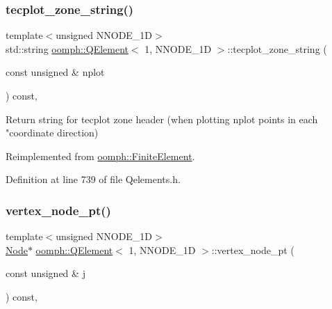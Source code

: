 \subsubsection{\texorpdfstring{tecplot\+\_\+zone\+\_\+string()}{tecplot\_zone\_string()}}
{\footnotesize\ttfamily template$<$unsigned N\+N\+O\+D\+E\+\_\+1D$>$ \\
std\+::string \hyperlink{classoomph_1_1QElement}{oomph\+::\+Q\+Element}$<$ 1, N\+N\+O\+D\+E\+\_\+1D $>$\+::tecplot\+\_\+zone\+\_\+string (\begin{DoxyParamCaption}\item[{const unsigned \&}]{nplot }\end{DoxyParamCaption}) const\hspace{0.3cm}{\ttfamily [inline]}, {\ttfamily [virtual]}}



Return string for tecplot zone header (when plotting nplot points in each "coordinate direction) 



Reimplemented from \hyperlink{classoomph_1_1FiniteElement_a3193df31f9ce38e0609d17a8ffb386c6}{oomph\+::\+Finite\+Element}.



Definition at line 739 of file Qelements.\+h.

\mbox{\label{classoomph_1_1QElement_3_011_00_01NNODE__1D_01_4_ab6e699d62c9c1208b8e2726f5d236a20}} 
\subsubsection{\texorpdfstring{vertex\+\_\+node\+\_\+pt()}{vertex\_node\_pt()}}
{\footnotesize\ttfamily template$<$unsigned N\+N\+O\+D\+E\+\_\+1D$>$ \\
\hyperlink{classoomph_1_1Node}{Node}$\ast$ \hyperlink{classoomph_1_1QElement}{oomph\+::\+Q\+Element}$<$ 1, N\+N\+O\+D\+E\+\_\+1D $>$\+::vertex\+\_\+node\+\_\+pt (\begin{DoxyParamCaption}\item[{const unsigned \&}]{j }\end{DoxyParamCaption}) const\hspace{0.3cm}{\ttfamily [inline]}, {\ttfamily [virtual]}}



